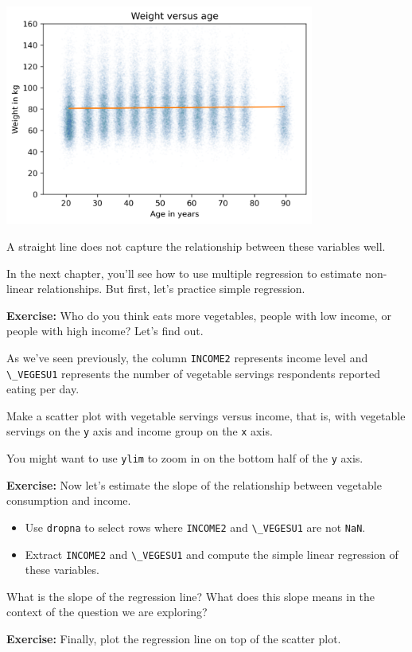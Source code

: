 \begin{center}
\includegraphics[width=4in]{09_relationships_files/09_relationships_107_0.png}
\end{center}

A straight line does not capture the relationship between these
variables well.

In the next chapter, you'll see how to use multiple regression to
estimate non-linear relationships. But first, let's practice simple
regression.

\textbf{Exercise:} Who do you think eats more vegetables, people with
low income, or people with high income? Let's find out.

As we've seen previously, the column \passthrough{\lstinline!INCOME2!}
represents income level and \passthrough{\lstinline!\_VEGESU1!}
represents the number of vegetable servings respondents reported eating
per day.

Make a scatter plot with vegetable servings versus income, that is, with
vegetable servings on the \passthrough{\lstinline!y!} axis and income
group on the \passthrough{\lstinline!x!} axis.

You might want to use \passthrough{\lstinline!ylim!} to zoom in on the
bottom half of the \passthrough{\lstinline!y!} axis.

\textbf{Exercise:} Now let's estimate the slope of the relationship
between vegetable consumption and income.

\begin{itemize}
\item
  Use \passthrough{\lstinline!dropna!} to select rows where
  \passthrough{\lstinline!INCOME2!} and
  \passthrough{\lstinline!\_VEGESU1!} are not
  \passthrough{\lstinline!NaN!}.
\item
  Extract \passthrough{\lstinline!INCOME2!} and
  \passthrough{\lstinline!\_VEGESU1!} and compute the simple linear
  regression of these variables.
\end{itemize}

What is the slope of the regression line? What does this slope means in
the context of the question we are exploring?

\textbf{Exercise:} Finally, plot the regression line on top of the
scatter plot.

